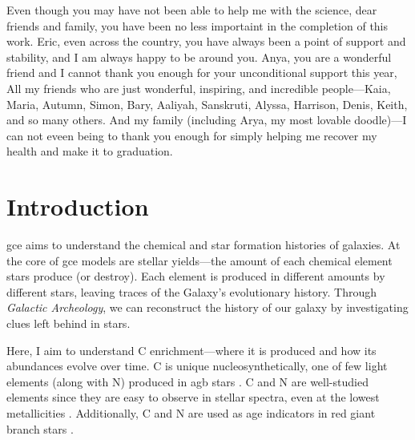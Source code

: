 \documentclass[12pt,oneside,letterpaper]{report}
\newcommand{\agb}{\gls{agb}}
\newcommand{\gce}{\gls{gce}}
\newcommand{\Gce}{\Gls{gce}}
\begin{document}
Even though you may have not been able to help me with the science, dear friends and family, you have been no less importaint in the completion of this work. 
Eric, even across the country, you have always been a point of support and stability, and I am always happy to be around you. Anya, you are a wonderful friend and I cannot thank you enough for your unconditional support this year, 
All my friends who are just wonderful, inspiring, and incredible people---Kaia, Maria, Autumn, Simon, Bary, Aaliyah, Sanskruti, Alyssa, Harrison, Denis, Keith, and so many others. 
And my family (including Arya, my most lovable doodle)---I can not eveen being to thank you enough for simply helping me recover my health and make it to graduation. 









\tableofcontents
\listoffigures
\listoftables
\newpage
{}









\chapter{Introduction}

\Gce{} aims to understand the chemical and star formation histories of galaxies. At the core of \gce{} models are stellar yields---the amount of each chemical element stars produce (or destroy). Each element is produced in different amounts by different stars, leaving traces of the Galaxy's evolutionary history. Through \textit{Galactic Archeology}, we can reconstruct the history of our galaxy by investigating clues left behind in stars.

Here, I aim to understand C enrichment---where it is produced and how its abundances evolve over time. C is unique nucleosynthetically, one of few light elements (along with N) produced in \agb{} stars \citep[e.g.][]{jennifer19, KL14}. C and N are well-studied elements since they are easy to observe in stellar spectra, even at the lowest metallicities \cite[e.g.][]{fabbian+09, nissen+14, lambert81, laird85, lambert86}. Additionally, C and N are used as age indicators in red giant branch stars \citep{martig16, MG15, hasselquist19, vincenzo+21}.
\end{document}
